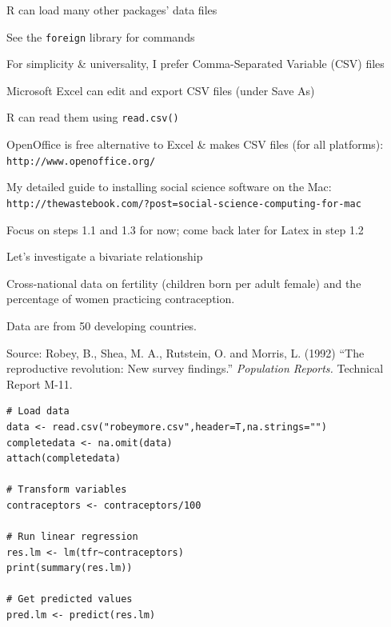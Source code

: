 \documentclass[pdflatex,landscape,titlepage]{foils}
\begin{document}
\bgclear

R can load many other packages' data files

See the \texttt{foreign} library for commands

For simplicity \& universality, I prefer Comma-Separated Variable (CSV) files

Microsoft Excel can edit and export CSV files (under Save As)

R can read them using \texttt{read.csv()}

OpenOffice is free alternative to Excel \& makes CSV files (for all platforms): \\
\texttt{http://www.openoffice.org/}

\bigskip

\bigskip

\bigskip

My detailed guide to installing social science
software on the Mac:  \texttt{http://thewastebook.com/?post=social-science-computing-for-mac}

Focus on steps 1.1 and 1.3 for now; come back later for Latex in step 1.2

\bgclear

Let's investigate a bivariate relationship

Cross-national data on fertility (children born per adult female) and the percentage of women practicing contraception.

Data are from 50 developing countries.

Source: Robey, B., Shea, M. A., Rutstein, O. and Morris, L. (1992)
``The reproductive revolution: New survey findings.''
\emph{Population Reports.} Technical Report M-11.

\bgclear

\begin{verbatim}
# Load data
data <- read.csv("robeymore.csv",header=T,na.strings="")
completedata <- na.omit(data)
attach(completedata)

# Transform variables
contraceptors <- contraceptors/100

# Run linear regression
res.lm <- lm(tfr~contraceptors)
print(summary(res.lm))

# Get predicted values
pred.lm <- predict(res.lm)
\end{verbatim}

\bgclear
\end{document}
